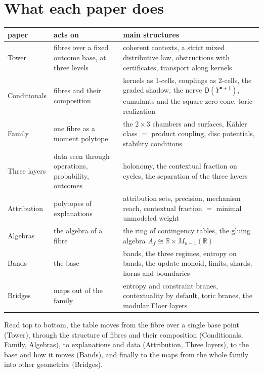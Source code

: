 \documentclass[11pt]{article}
\theoremstyle{definition}
\theoremstyle{remark}
\newcommand{\D}{\mathsf{D}}
\newcommand{\R}{\mathbb{R}}
\begin{document}
\section{What each paper does}\label{sec:papers}

\begin{center}
\small
\begin{tabular}{p{2.6cm}p{5.6cm}p{6.6cm}}
\toprule
paper & acts on & main structures\\
\midrule
Tower \cite{Tower} & fibres over a fixed outcome base, at three levels & coherent contexts, a strict mixed distributive law, obstructions with certificates, transport along kernels\\
Conditionals \cite{Conditionals} & fibres and their composition & kernels as 1-cells, couplings as 2-cells, the graded shadow, the nerve $\D(Y^{\bullet+1})$, cumulants and the square-zero cone, toric realization\\
Family \cite{Family} & one fibre as a moment polytope & the $2\times3$ chambers and surfaces, Kähler class $=$ product coupling, disc potentials, stability conditions\\
Three layers \cite{ThreeLayers} & data seen through operations, probability, outcomes & holonomy, the contextual fraction on cycles, the separation of the three layers\\
Attribution \cite{Attribution} & polytopes of explanations & attribution sets, precision, mechanism reach, contextual fraction $=$ minimal unmodeled weight\\
Algebras \cite{Algebras} & the algebra of a fibre & the ring of contingency tables, the gluing algebra $A_f\cong\R\times M_{n-1}(\R)$\\
Bands \cite{Bands} & the base & bands, the three regimes, entropy on bands, the update monoid, limits, shards, horns and boundaries\\
Bridges \cite{Bridges} & maps out of the family & entropy and constraint branes, contextuality by default, toric branes, the modular Floer layers\\
\bottomrule
\end{tabular}
\end{center}

Read top to bottom, the table moves from the fibre over a single base point (Tower), through the structure of fibres and their composition
(Conditionals, Family, Algebras), to explanations and data (Attribution, Three layers), to the base and how it moves (Bands), and finally to
the maps from the whole family into other geometries (Bridges).
\end{document}
